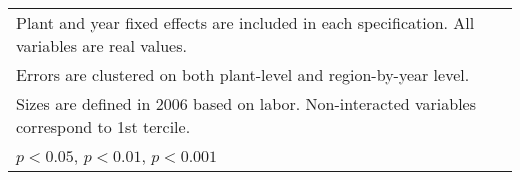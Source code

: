 \begin{table}[htbp]
\begin{tabular}{l*{6}{c}}
\multicolumn{7}{l}{\footnotesize Plant and year fixed effects are included in each specification. All variables are real values.}\\
\multicolumn{7}{l}{\footnotesize Errors are clustered on both plant-level and region-by-year level.}\\
\multicolumn{7}{l}{\footnotesize Sizes are defined in 2006 based on labor. Non-interacted variables correspond to 1st tercile.}\\
\multicolumn{7}{l}{\footnotesize \sym{*} \(p<0.05\), \sym{**} \(p<0.01\), \sym{***} \(p<0.001\)}\\
\end{tabular}
\end{table}
